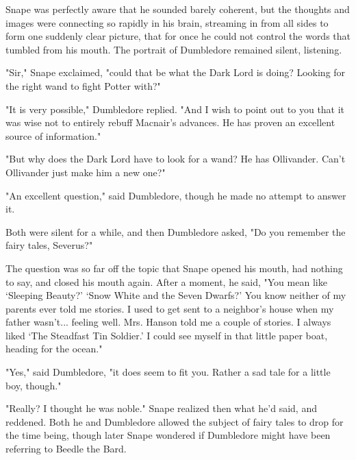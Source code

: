 Snape was perfectly aware that he sounded barely coherent, but the thoughts and images were connecting so rapidly in his brain, streaming in from all sides to form one suddenly clear picture, that for once he could not control the words that tumbled from his mouth. The portrait of Dumbledore remained silent, listening.

"Sir," Snape exclaimed, "could that be what the Dark Lord is doing? Looking for the right wand to fight Potter with?"

"It is very possible," Dumbledore replied. "And I wish to point out to you that it was wise not to entirely rebuff Macnair's advances. He has proven an excellent source of information."

"But why does the Dark Lord have to look for a wand? He has Ollivander. Can't Ollivander just make him a new one?"

"An excellent question," said Dumbledore, though he made no attempt to answer it.

Both were silent for a while, and then Dumbledore asked, "Do you remember the fairy tales, Severus?"

The question was so far off the topic that Snape opened his mouth, had nothing to say, and closed his mouth again. After a moment, he said, "You mean like `Sleeping Beauty?' `Snow White and the Seven Dwarfs?' You know neither of my parents ever told me stories. I used to get sent to a neighbor's house when my father wasn't... feeling well. Mrs. Hanson told me a couple of stories. I always liked `The Steadfast Tin Soldier.' I could see myself in that little paper boat, heading for the ocean."

"Yes," said Dumbledore, "it does seem to fit you. Rather a sad tale for a little boy, though."

"Really? I thought he was noble." Snape realized then what he'd said, and reddened. Both he and Dumbledore allowed the subject of fairy tales to drop for the time being, though later Snape wondered if Dumbledore might have been referring to Beedle the Bard.
